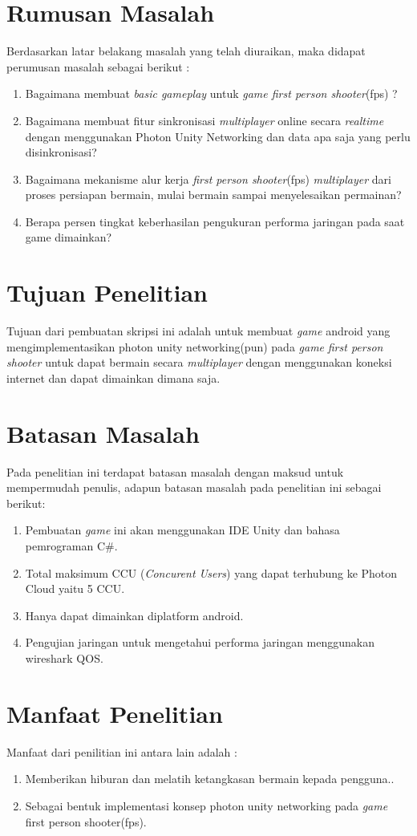 \section{Rumusan Masalah}
\noindent

Berdasarkan latar belakang masalah yang telah diuraikan, maka didapat perumusan masalah sebagai berikut :
\begin{enumerate}
	\item Bagaimana membuat \textit{basic gameplay} untuk \textit{game first person shooter}(fps) ?
	\item Bagaimana membuat fitur sinkronisasi \textit{multiplayer} online secara \textit{realtime} dengan menggunakan Photon Unity Networking dan data apa saja yang perlu disinkronisasi?
	\item Bagaimana mekanisme alur kerja \textit{first person shooter}(fps) \textit{multiplayer} dari proses persiapan bermain, mulai bermain sampai menyelesaikan permainan?
	\item Berapa persen tingkat keberhasilan pengukuran performa jaringan pada saat game dimainkan?
\end{enumerate}	
\section{Tujuan Penelitian}
\noindent

Tujuan dari pembuatan skripsi ini adalah untuk membuat \textit{\textit{game}} android yang mengimplementasikan photon unity networking(pun) pada \textit{\textit{game}} \textit{first person shooter} untuk dapat bermain secara \textit{multiplayer} dengan menggunakan koneksi internet dan dapat dimainkan dimana saja.

\section{Batasan Masalah}
Pada penelitian ini terdapat batasan masalah dengan maksud untuk mempermudah penulis, adapun batasan masalah pada penelitian ini sebagai berikut:
\begin{enumerate}
	\item Pembuatan \textit{\textit{game}} ini akan menggunakan IDE Unity dan bahasa pemrograman C\#.
	\item Total maksimum CCU (\textit{Concurent Users}) yang dapat terhubung ke Photon Cloud yaitu 5 CCU.
	\item Hanya dapat dimainkan diplatform android.
	\item Pengujian jaringan untuk mengetahui performa jaringan menggunakan wireshark QOS.
\end{enumerate}

\section{Manfaat Penelitian}
Manfaat dari penilitian ini antara lain adalah : 
\begin{enumerate}
	\item Memberikan hiburan dan melatih ketangkasan bermain 
	kepada pengguna..
	\item Sebagai bentuk implementasi konsep photon unity networking pada \textit{\textit{game}} first person shooter(fps).
\end{enumerate}